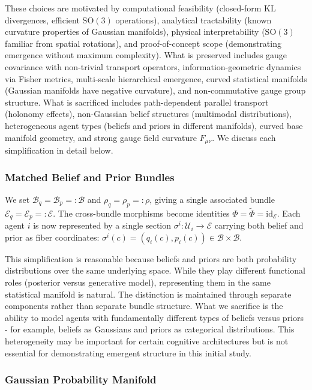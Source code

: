 \documentclass[11pt]{article}
\begin{document}
These choices are motivated by computational feasibility (closed-form KL divergences, efficient $\mathrm{SO}(3)$ operations), analytical tractability (known curvature properties of Gaussian manifolds), physical interpretability ($\mathrm{SO}(3)$ familiar from spatial rotations), and proof-of-concept scope (demonstrating emergence without maximum complexity). What is preserved includes gauge covariance with non-trivial transport operators, information-geometric dynamics via Fisher metrics, multi-scale hierarchical emergence, curved statistical manifolds (Gaussian manifolds have negative curvature), and non-commutative gauge group structure. What is sacrificed includes path-dependent parallel transport (holonomy effects), non-Gaussian belief structures (multimodal distributions), heterogeneous agent types (beliefs and priors in different manifolds), curved base manifold geometry, and strong gauge field curvature $F_{\mu\nu}$. We discuss each simplification in detail below.

\subsubsection{Matched Belief and Prior Bundles}

We set $\mathcal{B}_q = \mathcal{B}_p =: \mathcal{B}$ and $\rho_q = \rho_p =: \rho$, giving a single associated bundle $\mathcal{E}_q = \mathcal{E}_p =: \mathcal{E}$. The cross-bundle morphisms become identities $\Phi = \tilde{\Phi} = \mathrm{id}_{\mathcal{E}}$. Each agent $i$ is now represented by a single section $\sigma^i: \mathcal{U}_i \to \mathcal{E}$ carrying both belief and prior as fiber coordinates: $\sigma^i(c) = (q_i(c), p_i(c)) \in \mathcal{B} \times \mathcal{B}$.

This simplification is reasonable because beliefs and priors are both probability distributions over the same underlying space. While they play different functional roles (posterior versus generative model), representing them in the same statistical manifold is natural. The distinction is maintained through separate components rather than separate bundle structure. What we sacrifice is the ability to model agents with fundamentally different types of beliefs versus priors - for example, beliefs as Gaussians and priors as categorical distributions. This heterogeneity may be important for certain cognitive architectures but is not essential for demonstrating emergent structure in this initial study.

\subsubsection{Gaussian Probability Manifold}
\end{document}
